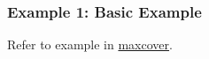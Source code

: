 \subsubsection*{Example 1: Basic Example}

Refer to example in \hyperref[sect:maxcover]{maxcover}.

